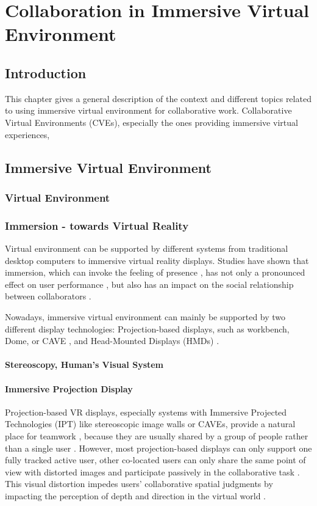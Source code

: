 \chapter{Collaboration in Immersive Virtual Environment}
\label{chapter:context}
\minitoc

\section{Introduction}
This chapter gives a general description of the context and different topics related to using immersive virtual environment for collaborative work. Collaborative Virtual Environments (CVEs), especially the ones providing immersive virtual experiences, 

\section{Immersive Virtual Environment}
\subsection{Virtual Environment}
\subsection{Immersion - towards Virtual Reality}
Virtual environment can be supported by different systems from traditional desktop computers to immersive virtual reality displays. Studies have shown that immersion, which can invoke the feeling of presence \citep{Slater1994DepthPre}, has not only a pronounced effect on user performance \citep{Dangelo2008Benefits}, but also has an impact on the social relationship between collaborators \citep{Slater2000Small}.

Nowadays, immersive virtual environment can mainly be supported by two different display technologies: Projection-based displays, such as workbench, Dome, or CAVE \citep{CruzNeira1993SPV}, and Head-Mounted Displays (HMDs) \citep{Melzer1997HMD}.


\subsubsection{Stereoscopy, Human's Visual System}
\subsubsection{Immersive Projection Display}
Projection-based VR displays, especially systems with Immersive Projected Technologies (IPT) like stereoscopic image walls or CAVEs, provide a natural place for teamwork \citep{Johanson2002IWP}, because they are usually shared by a group of people rather than a single user \citep{Benford1996SST}. However, most projection-based displays can only support one fully tracked active user, other co-located users can only share the same point of view with distorted images and participate passively in the collaborative task \citep{Bayon2006Multiple}. This visual distortion impedes users’ collaborative spatial judgments by impacting the perception of depth and direction in the virtual world \citep{Pollock2012Right}.

